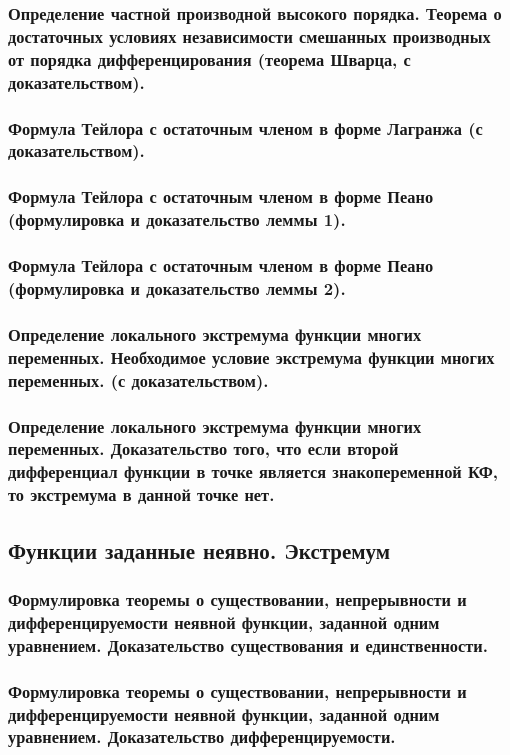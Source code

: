 \documentclass[10pt]{article}
\begin{document}
    \subsubsection{Определение частной производной высокого порядка. Теорема о достаточных условиях независимости смешанных производных от порядка дифференцирования (теорема Шварца, с доказательством).}
    \subsubsection{Формула Тейлора с остаточным членом в форме Лагранжа (с доказательством).}
    \subsubsection{Формула Тейлора с остаточным членом в форме Пеано (формулировка и доказательство леммы 1).}
    \subsubsection{Формула Тейлора с остаточным членом в форме Пеано (формулировка и доказательство леммы 2).}
    \subsubsection{Определение локального экстремума функции многих переменных. Необходимое условие экстремума функции многих переменных. (с доказательством).}
    \subsubsection{Определение локального экстремума функции многих переменных. Доказательство того, что если второй дифференциал функции в точке является знакопеременной КФ, то экстремума в данной точке нет.}
    \subsection{Функции заданные неявно. Экстремум}
    \subsubsection{Формулировка теоремы о существовании, непрерывности и дифференцируемости неявной функции, заданной одним уравнением. Доказательство существования и единственности.}
    \subsubsection{Формулировка теоремы о существовании, непрерывности и дифференцируемости неявной функции, заданной одним уравнением. Доказательство дифференцируемости.}
\end{document}
